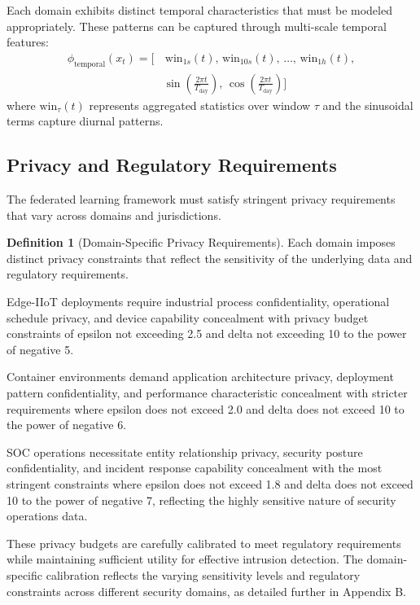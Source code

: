 \documentclass[12pt,a4paper]{article}
\theoremstyle{definition}
\newtheorem{definition}[theorem]{Definition}
\begin{document}
Each domain exhibits distinct temporal characteristics that must be modeled appropriately. These patterns can be captured through multi-scale temporal features:
\begin{equation}
\begin{aligned}
\phi_{\text{temporal}}(x_t) = \big[&\,\text{win}_{1s}(t),\, \text{win}_{10s}(t),\, \ldots,\, \text{win}_{1h}(t),\\
& \sin\!\left(\tfrac{2\pi t}{T_{\text{day}}}\right),\, \cos\!\left(\tfrac{2\pi t}{T_{\text{day}}}\right)\big]
\end{aligned}
\end{equation}
where $\text{win}_{\tau}(t)$ represents aggregated statistics over window $\tau$ and the sinusoidal terms capture diurnal patterns.

\subsection{Privacy and Regulatory Requirements}

The federated learning framework must satisfy stringent privacy requirements that vary across domains and jurisdictions.

\begin{definition}[Domain-Specific Privacy Requirements]
\label{def:privacy_requirements}
Each domain imposes distinct privacy constraints that reflect the sensitivity of the underlying data and regulatory requirements.

Edge-IIoT deployments require industrial process confidentiality, operational schedule privacy, and device capability concealment with privacy budget constraints of epsilon not exceeding 2.5 and delta not exceeding 10 to the power of negative 5.

Container environments demand application architecture privacy, deployment pattern confidentiality, and performance characteristic concealment with stricter requirements where epsilon does not exceed 2.0 and delta does not exceed 10 to the power of negative 6.

SOC operations necessitate entity relationship privacy, security posture confidentiality, and incident response capability concealment with the most stringent constraints where epsilon does not exceed 1.8 and delta does not exceed 10 to the power of negative 7, reflecting the highly sensitive nature of security operations data.
\end{definition}

These privacy budgets are carefully calibrated to meet regulatory requirements while maintaining sufficient utility for effective intrusion detection. The domain-specific calibration reflects the varying sensitivity levels and regulatory constraints across different security domains, as detailed further in Appendix B.
\end{document}

